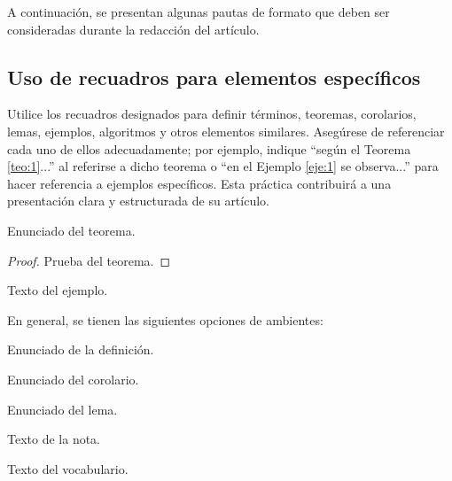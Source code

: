 \documentclass[fleqn]{Paquetes/RevDigMatEduInt}
\begin{document}
A continuación, se presentan algunas pautas de formato que deben ser consideradas durante la redacción del artículo.

\subsection{Uso de recuadros para elementos específicos}

Utilice los recuadros designados para definir términos, teoremas, corolarios, lemas, ejemplos, algoritmos y otros elementos similares. Asegúrese de referenciar cada uno de ellos adecuadamente; por ejemplo, indique ``según el Teorema \ref{teo:1}...'' al referirse a dicho teorema o ``en el Ejemplo \ref{eje:1} se observa...'' para hacer referencia a ejemplos específicos. Esta práctica contribuirá a una presentación clara y estructurada de su artículo.


\begin{teorema}
	Enunciado del teorema.
\end{teorema}

\begin{proof}
	Prueba del teorema.
\end{proof}

\begin{ejemplo}
	Texto del ejemplo.
\end{ejemplo}

En general, se tienen las siguientes opciones de ambientes:

\begin{definicion}
	Enunciado de la definición.
\end{definicion}

\begin{corolario}
	Enunciado del corolario.
\end{corolario}

\begin{lema}
	Enunciado del lema.
\end{lema}



\begin{nota}
	Texto de la nota.
\end{nota}

\begin{vocabulario}
	Texto del vocabulario.
\end{vocabulario}
\end{document}
